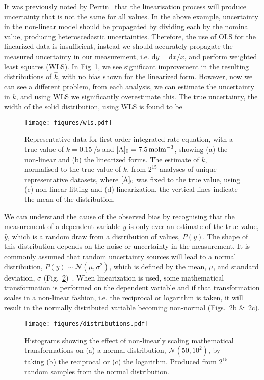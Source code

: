 \documentclass[journal=jceda8,manuscript=article]{achemso}
\begin{document}
It was previously noted by Perrin~\cite{perrin_linear_2017} that the linearisation process will produce uncertainty that is not the same for all values. 
In the above example, uncertainty in the non-linear model should be propagated by dividing each by the nominal value, producing heteroscedastic uncertainties. 
Therefore, the use of OLS for the linearized data is insufficient, instead we should accurately propagate the measured uncertainty in our measurement, i.e. $\mathrm{d}y = \mathrm{d}x / x$, and perform weighted least squares (WLS). 
In Fig~\ref{fig:wls}, we see significant improvement in the resulting distributions of $\hat{k}$, with no bias shown for the linearized form. 
However, now we can see a different problem, from each analysis, we can estimate the uncertainty in $k$, and using WLS we significantly overestimate this.
The true uncertainty, the width of the solid distribution, using WLS is found to be 
%
\begin{figure}
  \texttt{[image: figures/wls.pdf]}
  \caption{
    Representative data for first-order integrated rate equation, with a true value of $k=\SI{0.15}{\per\second}$ and $[\ce{A}]_0=\SI{7.5}{\mol\m^{-3}}$, showing (a) the non-linear and (b) the linearized forms. 
    The estimate of $k$, normalised to the true value of $k$, from $2^{15}$ analyses of unique representative datasets, where $[\ce{A}]_0$ was fixed to the true value, using (c) non-linear fitting and (d) linearization, the vertical lines indicate the mean of the distribution. 
    }
  \label{fig:wls}
\end{figure}
%



We can understand the cause of the observed bias by recognising that the measurement of a dependent variable $y$ is only ever an estimate of the true value, $\hat{y}$, which is a random draw from a distribution of values, $P(y)$. 
The shape of this distribution depends on the noise or uncertainty in the measurement. 
It is commonly assumed that random uncertainty sources will lead to a normal distribution, $P(y) \sim \mathcal{N}(\mu, \sigma^2)$, which is defined by the mean, $\mu$, and standard deviation, $\sigma$ (Fig.~\ref{fig:distributions})~\cite{monk_math_2010}.
When linearization is used, some mathematical transformation is performed on the dependent variable and if that transformation scales in a non-linear fashion, i.e. the reciprocal or logarithm is taken, it will result in the normally distributed variable becoming non-normal (Figs.~\ref{fig:distributions}b \&~\ref{fig:distributions}c).
%
\begin{figure}
  \texttt{[image: figures/distributions.pdf]}
  \caption{
    Histograms showing the effect of non-linearly scaling mathematical transformations on (a) a normal distribution, $\mathcal{N}(50, 10^2)$, by taking (b) the reciprocal or (c) the logarithm. 
    Produced from $2^{15}$ random samples from the normal distribution.
    }
  \label{fig:distributions}
\end{figure}
%
\end{document}
